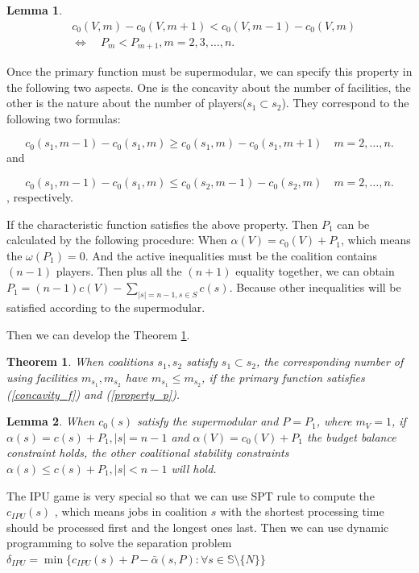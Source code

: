 \documentclass[UTF8]{article}
\newtheorem{thm}{\hspace{2em}Theorem}
\newtheorem{lem}{\hspace{2em}Lemma}
\begin{document}
\begin{lem}\label{lem3}
\[
\begin{aligned}
&c_0 (V,m) - c_0 (V,m+1) < c_0 (V,m-1) - c_0 (V,m) \\
&\Leftrightarrow \quad P_m < P_{m+1} , m=2,3,\ldots,n.
\end{aligned}
\]
\end{lem}

Once the primary function must be supermodular, we can specify this property in the following two aspects.
One is the concavity about the number of facilities,
the other is the nature about the number of players($s_1 \subset s_2$).
They correspond to the following two formulas:

\begin{equation}\label{concavity_f}
c_0(s_1,m-1)-c_0(s_1,m) \geq
  c_0(s_1,m)-c_0(s_1,m+1) \quad m=2,\ldots,n.
\end{equation}
and

\begin{equation}\label{property_p}
	c_0(s_1,m-1)-c_0(s_1,m) \leq
	  c_0(s_2,m-1)-c_0(s_2,m) \quad m=2,\ldots,n.
\end{equation}
, respectively.

If the characteristic function satisfies the above property. Then $ P_1$ can be calculated by the following procedure:
When $\alpha(V) = c_0(V) + P_1$, which means the $\omega(P_1) = 0$. And the active inequalities must be the coalition contains $(n-1)$ players.
Then plus all the $(n+1)$ equality together, we can obtain $P_1 = (n-1)c(V)- \sum_{|s|=n-1,s\in S}c(s)$.
Because other inequalities will be satisfied according to the supermodular.

Then we can develop the Theorem \ref{thm7}.

\begin{thm}\label{thm7}
When coalitions $s_1,s_2$ satisfy $s_1 \subset s_2$, the corresponding number of using facilities $ m_{s_1}, m_{s_2}$ have $m_{s_1} \leq m_{s_2}$, if the primary function satisfies  (\ref{concavity_f}) and (\ref{property_p}).
\end{thm}



\begin{lem}\label{lem4}
When $c_0(s)$ satisfy the supermodular and $P=P_1$, where $m_V=1$, if $\alpha(s)=c(s)+P_1, \left| s \right|= n-1$ and $\alpha(V)=c_0(V)+P_1$ the budget balance constraint holds, the other coalitional stability constraints $\alpha(s) \leq c(s)+P_1, \left| s \right| < n-1$ will hold.
\end{lem}



The IPU game is very special so that we can use SPT rule to compute the $c_{IPU}(s)$ , which means jobs in coalition $s$ with the shortest processing time should be processed first and the longest ones last. Then we can use dynamic programming to solve the separation problem $\delta_{IPU} = \min \big\{c_{IPU}(s)+P-\bar{\alpha}(s,P): \forall s \in \mathbb{S} \setminus \{N\}\big\} $
\end{document}
